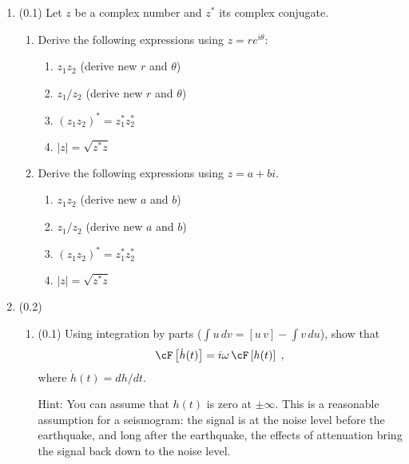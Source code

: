 \documentclass[11pt,titlepage,fleqn]{article}
\newcommand{\fft}{h}
\begin{document}

\begin{enumerate}

\item (0.1) Let $z$ be a complex number and $z^*$ its complex conjugate.

\begin{enumerate}

\item Derive the following expressions using $z = r e^{i\theta}$:
%
\begin{enumerate}
\item $z_1 z_2$ (derive new $r$ and $\theta$)
\item $z_1 / z_2$ (derive new $r$ and $\theta$)
\item $(z_1 z_2)^* = z_1^* z_2^*$
\item $|z| = \sqrt{z^* z}$
\end{enumerate}

\item Derive the following expressions using $z = a+bi$.
%
\begin{enumerate}
\item $z_1 z_2$ (derive new $a$ and $b$)
\item $z_1 / z_2$ (derive new $a$ and $b$)
\item $(z_1 z_2)^* = z_1^* z_2^*$
\item $|z| = \sqrt{z^* z}$
\end{enumerate}

\end{enumerate}


\item (0.2) \ptag\ 

\begin{enumerate}
\item (0.1) Using integration by parts ($\int u\,dv = [u\,v] - \int v\,du$), show that 
%
\begin{eqnarray}
\cF \left[ \dot{\fft}(t) \right] = i\omega \, \cF \left[ \fft(t) \right]
\label{fftder1}
\;,
\end{eqnarray}
%
where $\dot{\fft}(t) = d\fft/dt$.

Hint: You can assume that $h(t)$ is zero at $\pm\infty$. This is a reasonable assumption for a seismogram: the signal is at the noise level before the earthquake, and long after the earthquake, the effects of attenuation bring the signal back down to the noise level.


\end{enumerate}
\end{enumerate}
\end{document}
